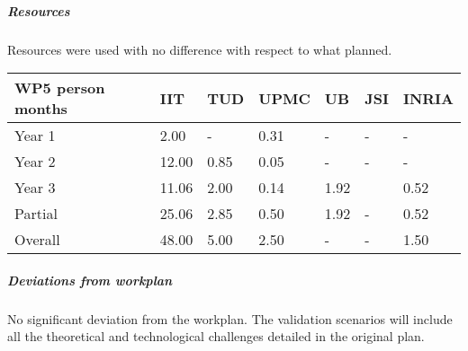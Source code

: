
\subparagraph*{Resources}

Resources were used with no difference with respect to what planned. 

\begin{center}
\begin{tabular}{|C{1.5cm}|C{1.5cm}|C{1.5cm}|C{2cm}|C{2cm}|C{2cm}|C{2cm}|}
\hline
\footnotesize \textbf{WP5 person months}& \footnotesize \textbf{IIT}&\footnotesize \textbf{TUD}&\footnotesize \textbf{UPMC}& \footnotesize \textbf{UB} &\footnotesize \textbf{JSI} & \footnotesize \textbf{INRIA} \\ \hline
\footnotesize Year 1 &  2.00  & - & 0.31 & - & - & -     \\  \hline
\footnotesize Year 2 &  12.00  & 0.85 & 0.05 & - & - & -     \\  \hline
\footnotesize Year 3 &  11.06 & 2.00 & 0.14 & 1.92 &  & 0.52 \\ \hline
\footnotesize Partial &  25.06 & 2.85 & 0.50 & 1.92 & - & 0.52 \\
\hline \hline
\footnotesize Overall &  48.00 & 5.00 & 2.50 & - & - & 1.50 \\ \hline
\end{tabular}
\end{center}

\subparagraph*{Deviations from workplan} 
No significant deviation from the workplan. The validation scenarios will include all the theoretical and technological challenges detailed in the original plan.
